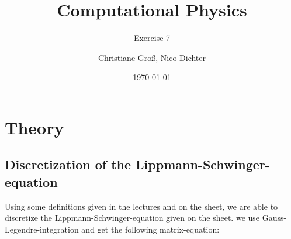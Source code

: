 \documentclass{scrartcl}
\title{Computational Physics}
\subtitle{Exercise 7}
\date{\today}
\author{Christiane Groß, Nico Dichter}
\begin{document}
	\maketitle
	
\section{Theory}

\subsection{Discretization of the Lippmann-Schwinger-equation}

Using some definitions given in the lectures and on the sheet, we are able to discretize the Lippmann-Schwinger-equation given on the sheet. we use Gauss-Legendre-integration and get the following matrix-equation:
\end{document}
